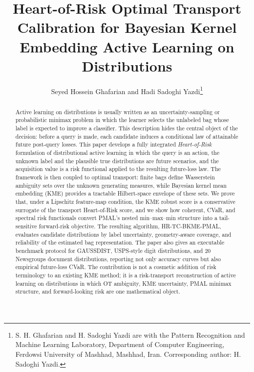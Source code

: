 \documentclass[10pt,journal]{IEEEtran}
\begin{document}
\title{Heart-of-Risk Optimal Transport Calibration for Bayesian Kernel Embedding Active Learning on Distributions}

\author{Seyed Hossein Ghafarian and Hadi Sadoghi Yazdi\thanks{S. H. Ghafarian and H. Sadoghi Yazdi are with the Pattern Recognition and Machine Learning Laboratory, Department of Computer Engineering, Ferdowsi University of Mashhad, Mashhad, Iran. Corresponding author: H. Sadoghi Yazdi.}}


\maketitle


\begin{abstract}
Active learning on distributions is usually written as an uncertainty-sampling or probabilistic minimax problem in which the learner selects the unlabeled bag whose label is expected to improve a classifier. This description hides the central object of the decision: before a query is made, each candidate induces a conditional law of attainable future post-query losses. This paper develops a fully integrated \emph{Heart-of-Risk} formulation of distributional active learning in which the query is an action, the unknown label and the plausible true distributions are future scenarios, and the acquisition value is a risk functional applied to the resulting future-loss law. The framework is then coupled to optimal transport: finite bags define Wasserstein ambiguity sets over the unknown generating measures, while Bayesian kernel mean embedding (KME) provides a tractable Hilbert-space envelope of these sets. We prove that, under a Lipschitz feature-map condition, the KME robust score is a conservative surrogate of the transport Heart-of-Risk score, and we show how coherent, CVaR, and spectral risk functionals convert PMAL's nested min--max--min structure into a tail-sensitive forward-risk objective. The resulting algorithm, HR-TC-BKME-PMAL, evaluates candidate distributions by label uncertainty, geometry-aware coverage, and reliability of the estimated bag representation. The paper also gives an executable benchmark protocol for GAUSSDIST, USPS-style digit distributions, and 20 Newsgroups document distributions, reporting not only accuracy curves but also empirical future-loss CVaR. The contribution is not a cosmetic addition of risk terminology to an existing KME method; it is a risk-transport reconstruction of active learning on distributions in which OT ambiguity, KME uncertainty, PMAL minimax structure, and forward-looking risk are one mathematical object.
\end{abstract}
\end{document}
